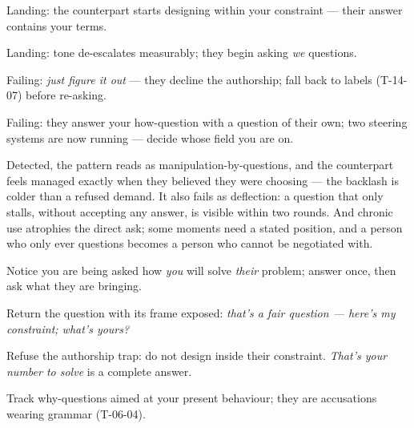 \begin{feedback}
  \item Landing: the counterpart starts designing within your constraint --- their answer contains your terms.
  \item Landing: tone de-escalates measurably; they begin asking \emph{we} questions.
  \item Failing: \emph{just figure it out} --- they decline the authorship; fall back to labels (T-14-07) before re-asking.
  \item Failing: they answer your how-question with a question of their own; two steering systems are now running --- decide whose field you are on.
\end{feedback}
\begin{failure}
Detected, the pattern reads as manipulation-by-questions, and the counterpart feels managed exactly when they believed they were choosing --- the backlash is colder than a refused demand. It also fails as deflection: a question that only stalls, without accepting any answer, is visible within two rounds. And chronic use atrophies the direct ask; some moments need a stated position, and a person who only ever questions becomes a person who cannot be negotiated with.
\end{failure}
\begin{countermeasures}
  \item Notice you are being asked how \emph{you} will solve \emph{their} problem; answer once, then ask what they are bringing.
  \item Return the question with its frame exposed: \emph{that's a fair question --- here's my constraint; what's yours?}
  \item Refuse the authorship trap: do not design inside their constraint. \emph{That's your number to solve} is a complete answer.
  \item Track why-questions aimed at your present behaviour; they are accusations wearing grammar (T-06-04).
\end{countermeasures}

\seesources
{}
